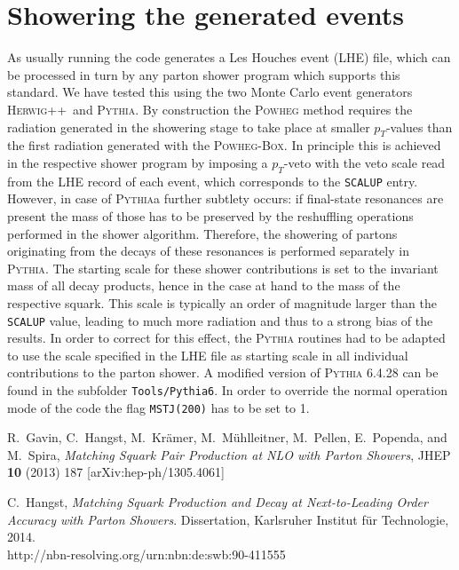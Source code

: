 \documentclass[a4paper,11pt]{article}
\newcommand{\PB}{\textsc{Powheg-Box}}
\newcommand{\HWG}{\textsc{Herwig++}}
\newcommand{\PYTH}{\textsc{Pythia}}
\begin{document}
\section*{Showering the generated events}
As usually running the code generates a Les Houches event (LHE) file, which can be processed in turn by any parton shower program which supports this standard. We have tested this using the two Monte Carlo event generators \HWG~and \PYTH. By construction the \textsc{Powheg} method requires the radiation generated in the showering stage to take 	place at smaller $p_T$-values than the first radiation generated with the \PB. In principle this is achieved in the respective shower program by imposing a $p_T$-veto with the veto scale read from the LHE record of each event, which corresponds to the {\tt SCALUP} entry. However, in case of \PYTH a further subtlety occurs: if final-state resonances are present the mass of those has to be preserved by the reshuffling operations performed in the shower algorithm. Therefore, the showering of partons originating from the decays of these resonances is performed separately in \PYTH. The starting scale for these shower contributions is set to the invariant mass of all decay 
products, hence in the case at hand to the mass of the respective squark. This scale is typically an order of magnitude larger than the {\tt SCALUP} value, leading to much more radiation and thus to a strong bias of the results. In order to correct for this effect, the \textsc{Pythia} routines had to be adapted to use the scale specified in the LHE file as starting scale in all individual contributions to the parton shower. A modified version of \textsc{Pythia 6.4.28} can be found in the subfolder {\tt Tools/Pythia6}. In order to override the normal operation mode of the code the flag  {\tt MSTJ(200)} has to be set to 1.

\begin{thebibliography}{99}
  
R.~Gavin, C.~Hangst, M.~Krämer, M.~Mühlleitner, M.~Pellen, E.~Popenda, and
  M.~Spira, {\em {Matching Squark Pair Production at NLO with Parton Showers}}, JHEP {\bf 10} (2013)  187 [arXiv:hep-ph/1305.4061]

C.~Hangst, {\em {Matching Squark Production and Decay at Next-to-Leading Order
  Accuracy with Parton Showers}}.
\newblock Dissertation, Karlsruher Institut für Technologie, 2014.\\
\newblock http://nbn-resolving.org/urn:nbn:de:swb:90-411555
  

\end{thebibliography}
\end{document}
